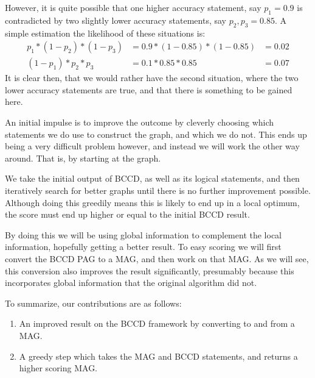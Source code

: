 \documentclass[11pt,a4paper]{report}
\theoremstyle{definition}
\begin{document}
However, it is quite possible that one higher accuracy statement, say
$p_1 = 0.9$ is contradicted by two slightly lower accuracy statements,
say $p_2, p_3 = 0.85$. A simple estimation the likelihood of these
situations is:
\begin{align*}
  p_1 * (1 - p_2) * (1 - p_3) &= 0.9 * (1 - 0.85) * (1 - 0.85) &= 0.02 \\
  (1 - p_1) * p_2 * p_3 &= 0.1 * 0.85 * 0.85 &= 0.07
\end{align*}
It is clear then, that we would rather have the second situation, where
the two lower accuracy statements are true, and that there is something to
be gained here.

An initial impulse is to improve the outcome by cleverly choosing which
statements we do use to construct the graph, and which we do not. This
ends up being a very difficult problem however, and instead we will work
the other way around. That is, by starting at the graph.

We take the initial output of BCCD, as well as its logical statements, and
then iteratively search for better graphs until there is no further
improvement possible. Although doing this greedily means this is likely to
end up in a local optimum, the score must end up higher or equal to the
initial BCCD result.

By doing this we will be using global information to complement the local
information, hopefully getting a better result. To easy scoring we will
first convert the BCCD PAG to a MAG, and then work on that MAG. As we will
see, this conversion also improves the result significantly, presumably
because this incorporates global information that the original algorithm
did not.

To summarize, our contributions are as follows:
\begin{enumerate}
  \item An improved result on the BCCD framework by converting to and from
    a MAG.

  \item A greedy step which takes the MAG and BCCD statements, and returns
    a higher scoring MAG.
\end{enumerate}

\end{document}

